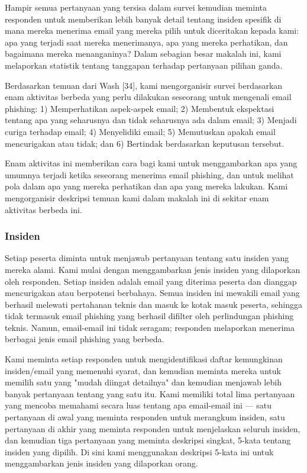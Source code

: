 \documentclass[lettersize,journal]{IEEEtran}
\begin{document}
Hampir semua pertanyaan yang tersisa dalam survei kemudian meminta responden
untuk memberikan lebih banyak detail tentang insiden spesifik di mana mereka
menerima email yang mereka pilih untuk diceritakan kepada kami: apa yang
terjadi saat mereka menerimanya, apa yang mereka perhatikan, dan bagaimana
mereka menanganinya? Dalam sebagian besar makalah ini, kami melaporkan
statistik tentang tanggapan terhadap pertanyaan pilihan ganda.

Berdasarkan temuan dari Wash [34], kami mengorganisir survei berdasarkan enam
aktivitas berbeda yang perlu dilakukan seseorang untuk mengenali email
phishing: 1) Memperhatikan aspek-aspek email; 2) Membentuk ekspektasi tentang
apa yang seharusnya dan tidak seharusnya ada dalam email; 3) Menjadi curiga
terhadap email; 4) Menyelidiki email; 5) Memutuskan apakah email mencurigakan
atau tidak; dan 6) Bertindak berdasarkan keputusan tersebut.

Enam aktivitas ini memberikan cara bagi kami untuk menggambarkan apa yang
umumnya terjadi ketika seseorang menerima email phishing, dan untuk melihat
pola dalam apa yang mereka perhatikan dan apa yang mereka lakukan. Kami
mengorganisir deskripsi temuan kami dalam makalah ini di sekitar enam aktivitas
berbeda ini.

\subsubsection{Insiden}

Setiap peserta diminta untuk menjawab pertanyaan tentang satu insiden yang
mereka alami. Kami mulai dengan menggambarkan jenis insiden yang dilaporkan
oleh responden. Setiap insiden adalah email yang diterima peserta dan dianggap
mencurigakan atau berpotensi berbahaya. Semua insiden ini mewakili email yang
berhasil melewati pertahanan teknis dan masuk ke kotak masuk peserta, sehingga
tidak termasuk email phishing yang berhasil difilter oleh perlindungan phishing
teknis. Namun, email-email ini tidak seragam; responden melaporkan menerima
berbagai jenis email phishing yang berbeda.

Kami meminta setiap responden untuk mengidentifikasi daftar kemungkinan
insiden/email yang memenuhi syarat, dan kemudian meminta mereka untuk memilih
satu yang "mudah diingat detailnya" dan kemudian menjawab lebih banyak
pertanyaan tentang yang satu itu. Kami memiliki total lima pertanyaan yang
mencoba memahami secara luas tentang apa email-email ini — satu pertanyaan di
awal yang meminta responden untuk merangkum insiden, satu pertanyaan di akhir
yang meminta responden untuk menjelaskan seluruh insiden, dan kemudian tiga
pertanyaan yang meminta deskripsi singkat, 5-kata tentang insiden yang dipilih.
Di sini kami menggunakan deskripsi 5-kata ini untuk menggambarkan jenis insiden
yang dilaporkan orang.
\end{document}

